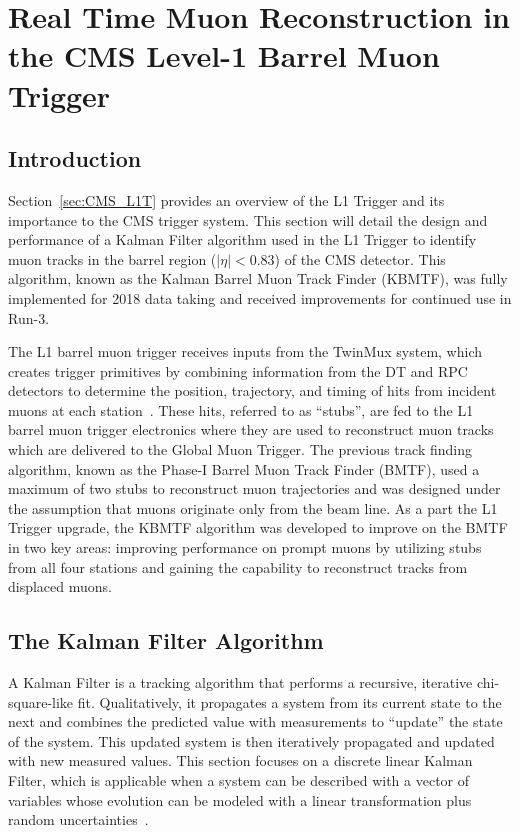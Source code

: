 
\chapter{Real Time Muon Reconstruction in the CMS Level-1 Barrel Muon Trigger}
\label{chap:kbmtf}

\section{Introduction} \label{sec:kbmtf_intro}
Section~\ref{sec:CMS_L1T} provides an overview of the L1 Trigger and its importance to the CMS trigger system. This section will detail the design and performance of a Kalman Filter algorithm used in the L1 Trigger to identify muon tracks in the barrel region ($|\eta|<0.83$) of the CMS detector. This algorithm, known as the Kalman Barrel Muon Track Finder (KBMTF), was fully implemented for 2018 data taking and received improvements for continued use in Run-3.

The L1 barrel muon trigger receives inputs from the TwinMux system, which creates trigger primitives by combining information from the DT and RPC detectors to determine the position, trajectory, and timing of hits from incident muons at each station~\cite{Triossi_2017}. These hits, referred to as ``stubs'', are fed to the L1 barrel muon trigger electronics where they are used to reconstruct muon tracks which are delivered to the Global Muon Trigger. The previous track finding algorithm, known as the Phase-I Barrel Muon Track Finder (BMTF), used a maximum of two stubs to reconstruct muon trajectories and was designed under the assumption that muons originate only from the beam line. As a part the L1 Trigger upgrade, the KBMTF algorithm was developed to improve on the BMTF in two key areas: improving performance on prompt muons by utilizing stubs from all four stations and gaining the capability to reconstruct tracks from displaced muons.

\section{The Kalman Filter Algorithm} \label{sec:kalman_filter}
A Kalman Filter is a tracking algorithm that performs a recursive, iterative chi-square-like fit. Qualitatively, it propagates a system from its current state to the next and combines the predicted value with measurements to ``update'' the state of the system. This updated system is then iteratively propagated and updated with new measured values. This section focuses on a discrete linear Kalman Filter, which is applicable when a system can be described with a vector of variables whose evolution can be modeled with a linear transformation plus random uncertainties~\cite{FRUHWIRTH1987444}.

